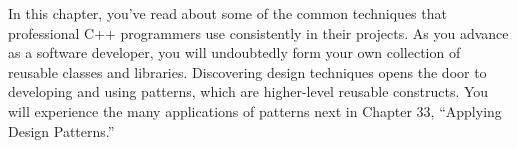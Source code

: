 In this chapter, you’ve read about some of the common techniques that professional C++ programmers use consistently in their projects. As you advance as a software developer, you will undoubtedly form your own collection of reusable classes and libraries. Discovering design techniques opens the door to developing and using patterns, which are higher-level reusable constructs. You will experience the many applications of patterns next in Chapter 33, “Applying Design Patterns.”